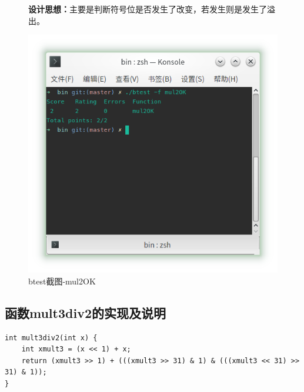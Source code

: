 \begin{figure}[H]
\begin{minipage}[c]{0.5\linewidth}
\textbf{设计思想：}主要是判断符号位是否发生了改变，若发生则是发生了溢出。
\end{minipage}
\begin{minipage}[c]{0.4\linewidth}
\centering
\includegraphics[width=0.9\linewidth]{figures/mul2OK}
\caption{btest截图-mul2OK}
\label{fig:mul2OK}
\end{minipage}
\end{figure}

\subsection{函数mult3div2的实现及说明}
\begin{verbatim}
int mult3div2(int x) {
    int xmult3 = (x << 1) + x;
    return (xmult3 >> 1) + (((xmult3 >> 31) & 1) & (((xmult3 << 31) >> 31) & 1));
}
\end{verbatim}

